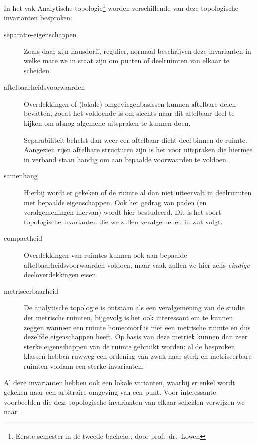 \documentclass[a4paper,11pt,openany,oneside,article]{memoir}
\begin{document}
In het vak Analytische topologie\footnote{Eerste semester in de tweede bachelor, door prof.~dr.~Lowen} worden verschillende van deze topologische invarianten besproken:
\begin{description}
  \item[separatie-eigenschappen] Zoals daar zijn hausdorff, regulier, normaal beschrijven deze invarianten in welke mate we in staat zijn om punten of deelruimten van elkaar te scheiden. 

  \item[aftelbaarheidsvoorwaarden] Overdekkingen of (lokale) omgevingenbasissen kunnen aftelbare delen bevatten, zodat het voldoende is om slechts naar dit aftelbaar deel te kijken om alsnog algemene uitspraken te kunnen doen.
    
    Separabiliteit behelst dan weer een aftelbaar dicht deel binnen de ruimte. Aangezien rijen aftelbare structuren zijn is het voor uitspraken die hiermee in verband staan handig om aan bepaalde voorwaarden te voldoen.
    
  \item[samenhang] Hierbij wordt er gekeken of de ruimte al dan niet uiteenvalt in deelruimten met bepaalde eigenschappen. Ook het gedrag van paden (en veralgemeningen hiervan) wordt hier bestudeerd. Dit is het soort topologische invarianten die we zullen veralgemenen in wat volgt.

  \item[compactheid] Overdekkingen van ruimtes kunnen ook aan bepaalde aftelbaarheidsvoorwaarden voldoen, maar vaak zullen we hier zelfs \emph{eindige} deeloverdekkingen eisen. 

  \item[metriseerbaarheid] De analytische topologie is ontstaan als een veralgemening van de studie der metrische ruimten, bijgevolg is het ook interessant om te kunnen zeggen wanneer een ruimte homeomorf is met een metrische ruimte en dus dezelfde eigenschappen heeft. Op basis van deze metriek kunnen dan zeer sterke eigenschappen van de ruimte gebruikt worden: al de besproken klassen hebben ruwweg een ordening van zwak naar sterk en metriseerbare ruimten voldaan een sterke invarianten.
\end{description}

Al deze invarianten hebben ook een lokale varianten, waarbij er enkel wordt gekeken naar een arbitraire omgeving van een punt. Voor interessante voorbeelden die deze topologische invarianten van elkaar scheiden verwijzen we naar~\cite{counterexamples-in-topology}.
\vspace{1em}
\end{document}
